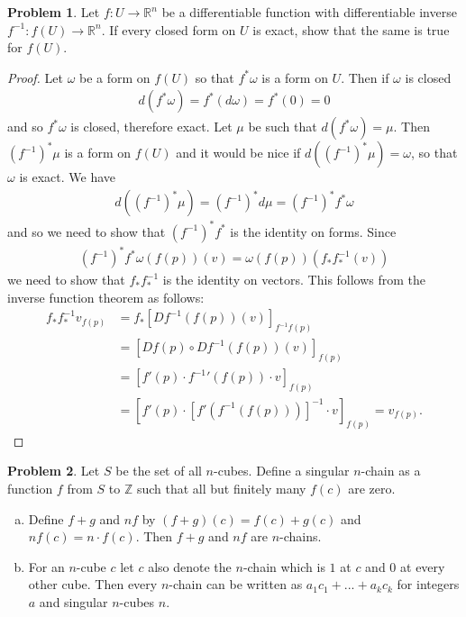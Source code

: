 \documentclass[20pt]{article}
\theoremstyle{plain}
\theoremstyle{definition}
\newtheorem*{problem}{Problem}
\newcommand{\reals}{\mathbb{R}}
\newcommand{\integers}{\mathbb{Z}}
\begin{document}
\begin{problem}{4.20}
  Let $f: U \to \reals^n$ be a differentiable function with differentiable inverse
  $f^{-1}: f(U) \to \reals^n$. If every closed form on $U$ is exact, show that
  the same is true for $f(U)$.
\end{problem}
\begin{proof}
  Let $\omega$ be a form on $f(U)$ so that $f^*\omega$ is a form on
  $U$.  Then if $\omega$ is closed
  \begin{align*}
    d(f^*\omega) = f^*(d \omega) = f^*(0) = 0
  \end{align*}
  and so $f^*\omega$ is closed, therefore exact.  Let $\mu$ be such that
  $d(f^*\omega)= \mu$.
  Then $(f^{-1})^*\mu$ is a form on $f(U)$ and it would be nice if
  $d((f^{-1})^*\mu) = \omega$, so that $\omega$ is exact.  We have
  \begin{align*}
    d((f^{-1})^*\mu) = (f^{-1})^*d\mu = (f^{-1})^* f^* \omega
  \end{align*}
  and so we need to show that $(f^{-1})^* f^*$ is the identity on forms.
  Since
  \begin{align*}
    (f^{-1})^*f^*\omega(f(p))(v) = \omega(f(p))(f_*f^{-1}_*(v))
  \end{align*}
  we need to show that $f_* f^{-1}_*$ is the identity on vectors.
  This follows from the inverse function theorem as follows:
  \begin{align*}
    f_*f^{-1}_*v_{f(p)} &=
    f_*[Df^{-1}(f(p))(v)]_{f^{-1}f(p)} \\&=
    [Df(p)\circ Df^{-1}(f(p))(v)]_{f(p)} \\&=
    [f'(p) \cdot f^{-1}{'}(f(p)) \cdot v ]_{f(p)} \\&=
    [f'(p) \cdot [f'(f^{-1}(f(p)))]^{-1} \cdot v]_{f(p)} = v_{f(p)}.
  \end{align*}
\end{proof}






















\begin{problem}{4.22}
  Let $S$ be the set of all $n$-cubes.  Define a singular $n$-chain as a function
  $f$ from $S$ to $\integers$ such that all but finitely many $f(c)$ are zero.
  \begin{enumerate}[(a)]
    \item
      Define $f+g$ and $nf$ by $(f+g)(c) = f(c) + g(c)$ and $nf(c) = n \cdot f(c)$.
      Then $f+g$ and $nf$ are $n$-chains.
    \item
      For an $n$-cube $c$ let $c$ also denote the $n$-chain which
      is $1$ at $c$ and $0$ at every other cube.
      Then every $n$-chain can be written as $a_1c_1 + ... + a_kc_k$
      for integers $a$ and singular $n$-cubes $n$.
  \end{enumerate}
\end{problem}
\end{document}
